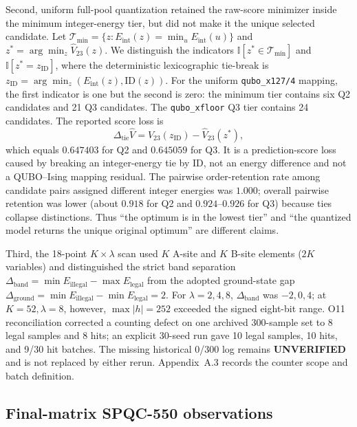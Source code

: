 Second, uniform full-pool quantization retained the raw-score
minimizer inside the minimum integer-energy tier, but did not make it the
unique selected candidate.  Let
$\mathcal T_{\min}=\{z:E_{\mathrm{int}}(z)=\min_uE_{\mathrm{int}}(u)\}$
and $z^*=\arg\min_z\widehat V_{23}(z)$.  We distinguish the indicators
$\mathbb I[z^*\in\mathcal T_{\min}]$ and
$\mathbb I[z^*=z_{\mathrm{ID}}]$, where the deterministic lexicographic
tie-break is
$z_{\mathrm{ID}}=\arg\min_z(E_{\mathrm{int}}(z),\mathrm{ID}(z))$.
For the uniform \texttt{qubo\_x127/4} mapping, the first indicator is one
but the second is zero: the minimum tier contains six Q2 candidates
and 21 Q3 candidates.  The \texttt{qubo\_xfloor} Q3 tier contains 24 candidates.
The reported score loss is
\begin{equation}
 \Delta_{\mathrm{tie}}\widehat V
 =\widehat V_{23}(z_{\mathrm{ID}})-\widehat V_{23}(z^*),
 \label{eq:tie-break-score-loss}
\end{equation}
which equals $0.647403$ for Q2 and $0.645059$ for Q3.  It is a
prediction-score loss caused by breaking an integer-energy tie by ID,
not an energy difference and not a QUBO--Ising mapping residual.
The pairwise order-retention rate among candidate pairs assigned
different integer energies was $1.000$; overall pairwise retention was
lower (about $0.918$ for Q2 and $0.924$--$0.926$ for Q3) because ties
collapse distinctions.  Thus
``the optimum is in the lowest tier'' and ``the quantized model returns the
unique original optimum'' are different claims.

Third, the 18-point $K\times\lambda$ scan used $K$ A-site and $K$ B-site
elements ($2K$ variables) and distinguished the strict band separation
$\Delta_{\mathrm{band}}=\min E_{\mathrm{illegal}}-\max E_{\mathrm{legal}}$
from the adopted ground-state gap
$\Delta_{\mathrm{ground}}=\min E_{\mathrm{illegal}}-\min E_{\mathrm{legal}}=2$.
For $\lambda=2,4,8$, $\Delta_{\mathrm{band}}$ was $-2,0,4$; at
$K=52,\lambda=8$, however, $\max|h|=252$ exceeded the signed eight-bit
range.  O11 reconciliation corrected a counting defect on one archived
300-sample set to 8 legal samples and 8 hits; an explicit 30-seed run gave
10 legal samples, 10 hits, and 9/30 hit batches.  The missing historical
0/300 log remains \textbf{UNVERIFIED} and is not replaced by either rerun.
Appendix~A.3 records the counter scope and batch definition.

\subsection{Final-matrix SPQC-550 observations}

